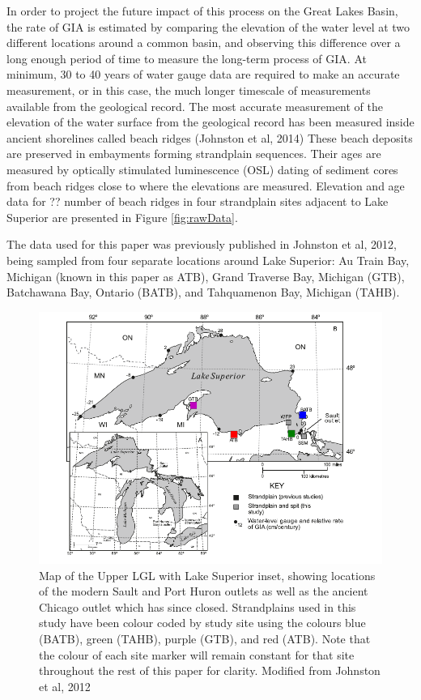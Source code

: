 \documentclass{article}
\begin{document}
\newpage

 
 In order to project the future impact of this process on the Great Lakes Basin,
 the rate of GIA is estimated by comparing the elevation of the water level at
 two different locations around a common basin, and
 observing this difference over a long enough period of time to measure the long-term
 process of GIA. At minimum, 30 to 40 years of water gauge data are required to
 make an accurate measurement, or in this case, the much longer timescale of
 measurements available from the geological record.
 The most accurate measurement of the elevation of the water surface from the geological record
 has been measured inside ancient
 shorelines called beach ridges (Johnston et al, 2014)
 These beach deposits are preserved in embayments forming strandplain sequences.
 Their ages are measured by optically stimulated
 luminescence (OSL) dating of sediment cores from beach ridges close to where the
 elevations are measured. Elevation and age data for ?? number of beach ridges in
 four strandplain sites adjacent to Lake Superior are presented in Figure \ref{fig:rawData}.\\


\newpage 
 
 The data used for this paper was previously published in
 Johnston et al, 2012, being sampled from four separate locations around
  Lake Superior:
 Au Train Bay, Michigan (known in this paper as ATB), Grand Traverse Bay,
 Michigan (GTB), Batchawana Bay, Ontario (BATB), and 
 Tahquamenon Bay, Michigan (TAHB).\\
 \begin{figure}[h]
	\includegraphics[width=0.8\linewidth]{johnstonLaurentianMapWithSites.png}
	\caption{Map of the Upper LGL with Lake Superior inset, showing locations of the modern Sault and Port Huron
	outlets as well as the ancient Chicago outlet which has since closed. Strandplains used
	in this study have been colour coded by study site using the colours blue (BATB), green (TAHB), purple (GTB), and red (ATB). Note that
	 the colour of each site marker will remain constant for that site throughout the rest of
	 this paper for clarity. Modified from Johnston et al, 2012}
	\label{fig:johnstonLaurentianMapWithSites}
 \end{figure}
\end{document}
